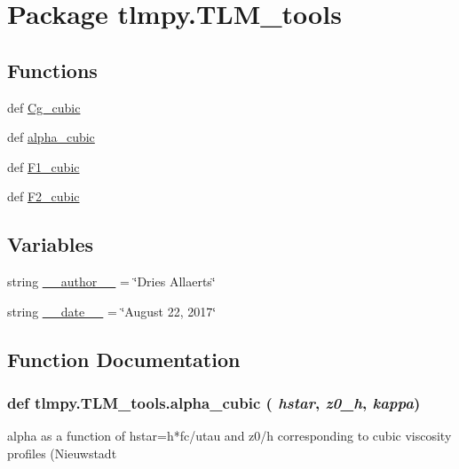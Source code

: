 \hypertarget{namespacetlmpy_1_1TLM__tools}{
\section{Package tlmpy.TLM\_\-tools}
\label{namespacetlmpy_1_1TLM__tools}
}
\subsection*{Functions}
\begin{DoxyCompactItemize}
\item 
def \hyperlink{namespacetlmpy_1_1TLM__tools_ae33249db415ec555ccca9a38614cbefa}{Cg\_\-cubic}
\item 
def \hyperlink{namespacetlmpy_1_1TLM__tools_a9dec65d7db04b6f14e734cab5bf37d86}{alpha\_\-cubic}
\item 
def \hyperlink{namespacetlmpy_1_1TLM__tools_a8f7f47a2f001dada2bc0736f7030c765}{F1\_\-cubic}
\item 
def \hyperlink{namespacetlmpy_1_1TLM__tools_a31232724f3f3be8294309471d36d3e9f}{F2\_\-cubic}
\end{DoxyCompactItemize}
\subsection*{Variables}
\begin{DoxyCompactItemize}
\item 
string \hyperlink{namespacetlmpy_1_1TLM__tools_a9cd290fffdeffb1cd06bae52ade4ebf6}{\_\-\_\-author\_\-\_\-} = \char`\"{}Dries Allaerts\char`\"{}
\item 
string \hyperlink{namespacetlmpy_1_1TLM__tools_a2677c6d2f0ef70cc29273614a48cff98}{\_\-\_\-date\_\-\_\-} = \char`\"{}August 22, 2017\char`\"{}
\end{DoxyCompactItemize}


\subsection{Function Documentation}
\hypertarget{namespacetlmpy_1_1TLM__tools_a9dec65d7db04b6f14e734cab5bf37d86}{
\subsubsection[{alpha\_\-cubic}]{\setlength{\rightskip}{0pt plus 5cm}def tlmpy.TLM\_\-tools.alpha\_\-cubic ( {\em hstar}, \/   {\em z0\_\-h}, \/   {\em kappa})}}
\label{namespacetlmpy_1_1TLM__tools_a9dec65d7db04b6f14e734cab5bf37d86}
\begin{DoxyVerb}
alpha as a function of hstar=h*fc/utau and z0/h
corresponding to cubic viscosity profiles (Nieuwstadt
\end{DoxyVerb}
 

